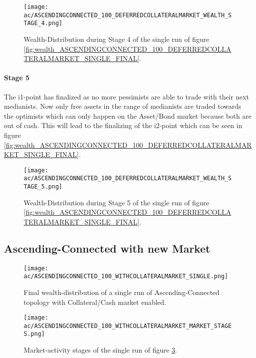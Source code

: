 \documentclass[Bachelorarbeit.tex]{subfiles}
\begin{document}
\begin{figure}[H]
	\centering
  \texttt{[image: ac/ASCENDINGCONNECTED\_100\_DEFERREDCOLLATERALMARKET\_WEALTH\_STAGE\_4.png]}
  	\caption{Wealth-Distribution during Stage 4 of the single run of figure \ref{fig:wealth_ASCENDINGCONNECTED_100_DEFERREDCOLLATERALMARKET_SINGLE_FINAL}.}
	\label{fig:markets_ASCENDINGCONNECTED_100_DEFERREDCOLLATERALMARKET_WEALTH_STAGE_4}
\end{figure}

\paragraph{Stage 5}
The i1-point has finalized as no more pessimists are able to trade with their next medianists. Now only free assets in the range of medianists are traded towards the optimists which can only happen on the Asset/Bond market because both are out of cash. This will lead to the finalizing of the i2-point which can be seen in figure \ref{fig:wealth_ASCENDINGCONNECTED_100_DEFERREDCOLLATERALMARKET_SINGLE_FINAL}.
 
\begin{figure}[H]
	\centering
  \texttt{[image: ac/ASCENDINGCONNECTED\_100\_DEFERREDCOLLATERALMARKET\_WEALTH\_STAGE\_5.png]}
  	\caption{Wealth-Distribution during Stage 5 of the single run of figure \ref{fig:wealth_ASCENDINGCONNECTED_100_DEFERREDCOLLATERALMARKET_SINGLE_FINAL}.}
  	\label{fig:markets_ASCENDINGCONNECTED_100_DEFERREDCOLLATERALMARKET_WEALTH_STAGE_5}
\end{figure}

\subsection{Ascending-Connected with new Market}

\begin{figure}[H]
	\centering
  \texttt{[image: ac/ASCENDINGCONNECTED\_100\_WITHCOLLATERALMARKET\_SINGLE.png]}
  	\caption{Final wealth-distribution of a single run of Ascending-Connected topology with Collateral/Cash market enabled.}
	\label{fig:wealth_ASCENDINGCONNECTED_100_WITHCOLLATERALMARKET_SINGLE}
\end{figure}

\begin{figure}[H]
	\centering
  \texttt{[image: ac/ASCENDINGCONNECTED\_100\_WITHCOLLATERALMARKET\_MARKET\_STAGES.png]}
  	\caption{Market-activity stages of the single run of figure \ref{fig:wealth_ASCENDINGCONNECTED_100_WITHCOLLATERALMARKET_SINGLE}.}
	\label{fig:markets_ASCENDINGCONNECTED_100_WITHCOLLATERALMARKET_MARKET_STAGES}
\end{figure}
\end{document}
